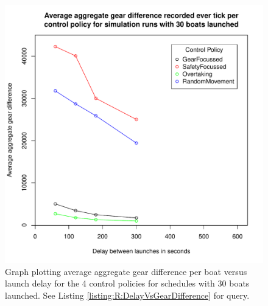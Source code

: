 \begin{figure}
\begin{center}
  \includegraphics[scale=0.8]{"images/graphs/Average aggregate gear difference recorded ever tick per control policy for simulation runs with 30 boats launched"}
  \caption{Graph plotting average aggregate gear difference per boat versus launch delay for the 4 control policies for schedules with 30 boats launched. See Listing \ref{listing:R:DelayVsGearDifference} for query.}
  \label{appendix:graphs:gear_difference_30_launches}
\end{center}
\end{figure}